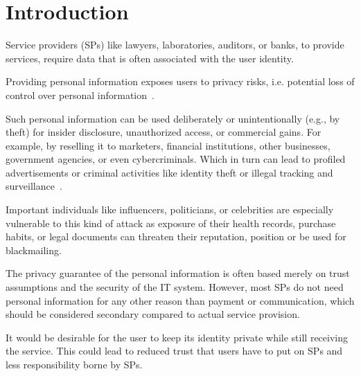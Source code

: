 \documentclass{ieeeaccess}
\begin{document}
\titlepgskip=-15pt

\maketitle
\section{Introduction}
Service providers (SPs) like lawyers, laboratories, auditors, or banks, to provide services, require data that is often associated with the user identity.

Providing personal information exposes users to privacy risks, i.e. potential loss of control over personal information~\cite{smithInformationPrivacyResearch2011}.

Such personal information can be used deliberately or unintentionally
(e.g., by theft) for insider disclosure, unauthorized access, or commercial gains. For example, by reselling it to marketers, financial institutions, other businesses, government agencies, or even cybercriminals. Which in turn can lead to profiled advertisements or criminal activities like identity theft or illegal tracking and surveillance~\cite{smithInformationPrivacyResearch2011}.

Important individuals like influencers, politicians, or celebrities are especially vulnerable to this kind of attack as exposure of their health records, purchase habits, or legal documents can threaten their reputation, position or be used for blackmailing.

The privacy guarantee of the personal information is often based merely on trust assumptions and the security of the IT system. However, most SPs do not need personal information for any other reason than payment or communication, which should be considered secondary compared to actual service provision.

It would be desirable for the user to keep its identity private while still receiving the service. This could lead to reduced trust that users have to put on SPs and less responsibility borne by SPs.
\end{document}
